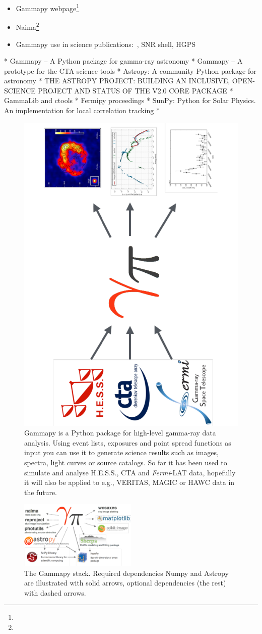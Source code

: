 \begin{itemize}
	\item Gammapy webpage\footnote{\GammapyUrl}
	\item Naima\footnote{\NaimaUrl}~\citep{Naima}
	\item Gammapy use in science publications:~\citep{Owen2015}, SNR shell, HGPS
\end{itemize}

* Gammapy – A Python package for gamma-ray astronomy
* Gammapy – A prototype for the CTA science tools
* Astropy: A community Python package for astronomy
* THE ASTROPY PROJECT: BUILDING AN INCLUSIVE, OPEN-SCIENCE PROJECT AND STATUS
OF THE V2.0 CORE PACKAGE * GammaLib and ctools * Fermipy proceedings * SunPy:
Python for Solar Physics. An implementation for local correlation tracking *

\begin{figure}[t]
	\centering
	\includegraphics[height=0.5\textwidth, angle=270]{static/gammapy-big-picture}
	\caption{
		Gammapy is a Python package for high-level gamma-ray data analysis. Using event
		lists, exposures and point spread functions as input you can use it to generate
		science results such as images, spectra, light curves or source catalogs. So
		far it has been used to simulate and analyse H.E.S.S., CTA and
		\textit{Fermi}-LAT data, hopefully it will also be applied to e.g., VERITAS,
		MAGIC or HAWC data in the future.
	}
	\label{fig:big-picture}
\end{figure}

\begin{figure}[t]
	\centering
	\includegraphics[width=0.5\textwidth]{static/gammapy-dependencies}
	\caption{
		The Gammapy stack. Required dependencies Numpy and Astropy are illustrated with
		solid arrows, optional dependencies (the rest) with dashed arrows.
	}
	\label{fig:dependencies}
\end{figure}
